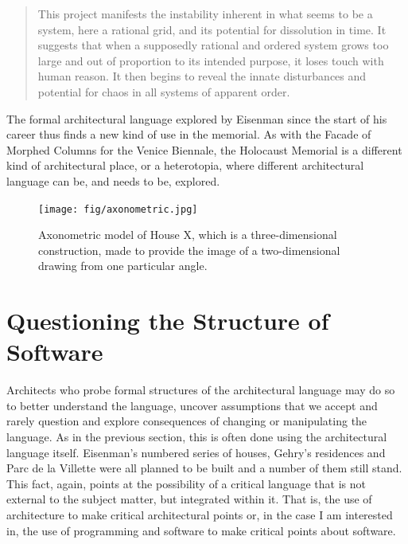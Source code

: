 \begin{quote}
This project manifests the instability inherent in what seems to be a system, here a
rational grid, and its potential for dissolution in time. It suggests that when a supposedly
rational and ordered system grows too large and out of proportion to its intended purpose,
it loses touch with human reason. It then begins to reveal the innate disturbances and potential
for chaos in all systems of apparent order.
\end{quote}

The formal architectural language explored by Eisenman since the start of his career thus
finds a new kind of use in the memorial. As with the Facade of Morphed Columns for the Venice
Biennale, the Holocaust Memorial is a different kind of architectural place, or a heterotopia,
where different architectural language can be, and needs to be, explored.

%
%

\begin{figure}
\centering
\vspace{-1em}
\texttt{[image: fig/axonometric.jpg]}\quad
\caption{Axonometric model of House X, which is a three-dimensional construction,
made to provide the image of a two-dimensional drawing from one particular angle.}
\label{fig:axonometric}
\end{figure}

\section{Questioning the Structure of Software}
Architects who probe formal structures of the architectural language may do so to better understand
the language, uncover assumptions that we accept and rarely question and explore consequences of
changing or manipulating the language. As in the previous section, this is often done using the
architectural language itself. Eisenman's numbered series of houses, Gehry's residences and Parc
de la Villette were all planned to be built and a number of them still stand.
This fact, again, points at the possibility of a critical language that is not external to the subject
matter, but integrated within it. That is, the use of architecture to make critical architectural points
or, in the case I am interested in, the use of programming and software to make critical points about
software.

